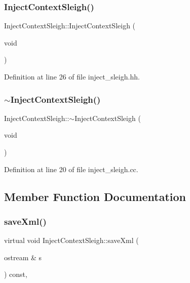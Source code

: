 \subsubsection{\texorpdfstring{InjectContextSleigh()}{InjectContextSleigh()}}
{\footnotesize\ttfamily Inject\+Context\+Sleigh\+::\+Inject\+Context\+Sleigh (\begin{DoxyParamCaption}\item[{void}]{ }\end{DoxyParamCaption})\hspace{0.3cm}{\ttfamily [inline]}}



Definition at line 26 of file inject\+\_\+sleigh.\+hh.

\mbox{\label{class_inject_context_sleigh_ac3d075f7afca72cebc14e5e44db94c20}} 
\subsubsection{\texorpdfstring{$\sim$InjectContextSleigh()}{~InjectContextSleigh()}}
{\footnotesize\ttfamily Inject\+Context\+Sleigh\+::$\sim$\+Inject\+Context\+Sleigh (\begin{DoxyParamCaption}\item[{void}]{ }\end{DoxyParamCaption})\hspace{0.3cm}{\ttfamily [virtual]}}



Definition at line 20 of file inject\+\_\+sleigh.\+cc.



\subsection{Member Function Documentation}
\mbox{\label{class_inject_context_sleigh_a5f54348510c2aa5002d93d3fbf0c645a}} 
\subsubsection{\texorpdfstring{saveXml()}{saveXml()}}
{\footnotesize\ttfamily virtual void Inject\+Context\+Sleigh\+::save\+Xml (\begin{DoxyParamCaption}\item[{ostream \&}]{s }\end{DoxyParamCaption}) const\hspace{0.3cm}{\ttfamily [inline]}, {\ttfamily [virtual]}}



